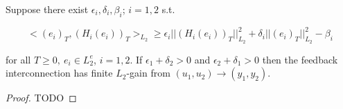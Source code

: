 \begin{Theorem}
 Suppose there exist $\epsilon_i, \delta_i, \beta_i$; $i=1,2$ s.t.

 $$<(e_i)_T, (H_i(e_i))_T>_{L_2} \ge \epsilon_i ||(H_i(e_i))_T||_{L_2}^2+\delta_i
 ||(e_i)_T||_{L_2}^2-\beta_i$$

 for all $T\ge0, \ e_i\in L_2^e$, $i=1,2$. If $\epsilon_1+\delta_2>0$ and $\epsilon_2+\delta_1>0$
 then the feedback interconnection has finite $L_2$-gain from $(u_1,u_2)\rightarrow(y_1,y_2)$.
 \begin{proof}
  TODO
 \end{proof}
\end{Theorem}